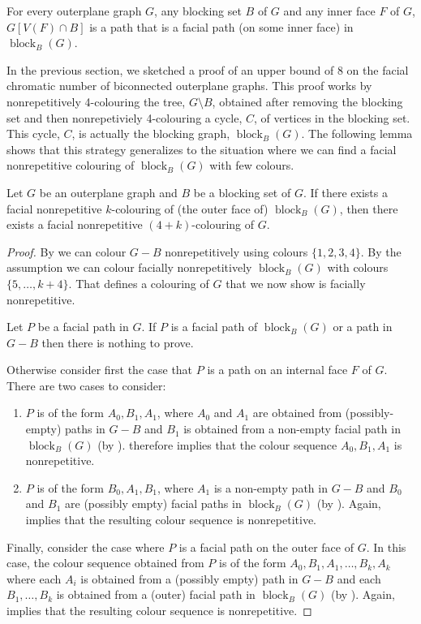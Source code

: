 \documentclass{patmorin}
\DeclareMathOperator{\block}{block}
\begin{document}
\begin{obs}
For every outerplane graph $G$, any blocking set $B$ of $G$ and any
inner face $F$ of $G$, $G[V(F)\cap B]$ is a path that is a facial path (on
some inner face)  in $\block_B(G)$.
\end{obs}


In the previous section, we sketched a proof of an upper bound of
8 on the facial chromatic number of biconnected outerplane graphs.
This proof works by nonrepetitively 4-colouring the tree, $G\setminus B$, obtained after removing the blocking set and then nonrepetiviely
4-colouring a cycle, $C$, of vertices in the blocking set.  This cycle,
$C$, is actually the blocking graph, $\block_B(G)$.  The following lemma
shows that this strategy generalizes to the situation where we can find
a facial nonrepetitive colouring of $\block_B(G)$ with few colours.

\begin{lem}
  Let $G$ be an outerplane graph and $B$ be a blocking set of $G$. If
  there exists a facial nonrepetitive $k$-colouring of (the outer 
  face of) $\block_{B}(G)$, then there exists a facial nonrepetitive
  $(4+k)$-colouring of $G$.
\end{lem}

\begin{proof}
By  we can colour $G-B$ nonrepetitively using colours
$\{1,2,3,4\}$. By the assumption we can colour  facially
nonrepetitively $\block_{B}(G)$ with colours $\{5,\dots, k+4\}$. That
defines a colouring of $G$ that we now show is facially
nonrepetitive. 

Let $P$ be a facial path in $G$. If $P$ is a facial path of
$\block_{B}(G)$ or a path in $G-B$ then there is nothing to prove.

Otherwise consider first the case that $P$ is a path on an internal
face $F$ of $G$.   There are two cases to consider:
\begin{enumerate}
\item $P$ is of the form $A_0,B_1,A_1$, where $A_0$ and $A_1$ are obtained
from (possibly-empty) paths in $G-B$ and $B_1$ is obtained from a
non-empty facial path in $\block_B(G)$ (by ).   therefore
implies that the colour sequence $A_0,B_1,A_1$ is nonrepetitive.

\item $P$ is of the form $B_0,A_1,B_1$, where $A_1$ is a non-empty path
  in $G-B$ and $B_0$ and $B_1$ are (possibly empty) facial paths in
  $\block_B(G)$ (by ).
Again,  implies that the resulting colour sequence
is nonrepetitive.
\end{enumerate}

Finally, consider the case where $P$ is a facial path on the outer
face of $G$.  In this case, the colour sequence obtained from $P$ is
of the form $A_0,B_1,A_1,\ldots,B_k,A_k$ where each $A_i$ is obtained
from a (possibly empty) path in $G-B$ and each $B_1,\ldots,B_k$ is
obtained from a (outer) facial path in $\block_B(G)$ (by ). 
Again,  implies that the resulting colour sequence
is nonrepetitive.
\end{proof}
\end{document}
